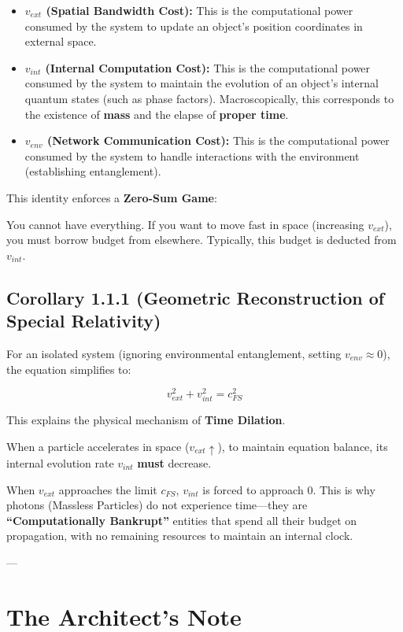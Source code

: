 \documentclass[11pt,a4paper,twoside]{book}
\begin{document}
\begin{itemize}
\item \textbf{$v_{ext}$ (Spatial Bandwidth Cost):} This is the computational power consumed by the system to update an object's position coordinates in external space.

\item \textbf{$v_{int}$ (Internal Computation Cost):} This is the computational power consumed by the system to maintain the evolution of an object's internal quantum states (such as phase factors). Macroscopically, this corresponds to the existence of \textbf{mass} and the elapse of \textbf{proper time}.

\item \textbf{$v_{env}$ (Network Communication Cost):} This is the computational power consumed by the system to handle interactions with the environment (establishing entanglement).
\end{itemize}

This identity enforces a \textbf{Zero-Sum Game}:

You cannot have everything. If you want to move fast in space (increasing \textbf{$v_{ext}$}), you must borrow budget from elsewhere. Typically, this budget is deducted from \textbf{$v_{int}$}.

\subsection{Corollary 1.1.1 (Geometric Reconstruction of Special Relativity)}

For an isolated system (ignoring environmental entanglement, setting \textbf{$v_{env} \approx 0$}), the equation simplifies to:

$$v_{ext}^2 + v_{int}^2 = c_{FS}^2$$

This explains the physical mechanism of \textbf{Time Dilation}.

When a particle accelerates in space (\textbf{$v_{ext} \uparrow$}), to maintain equation balance, its internal evolution rate \textbf{$v_{int}$} \textbf{must} decrease.

When \textbf{$v_{ext}$} approaches the limit \textbf{$c_{FS}$}, \textbf{$v_{int}$} is forced to approach 0. This is why photons (Massless Particles) do not experience time---they are \textbf{``Computationally Bankrupt''} entities that spend all their budget on propagation, with no remaining resources to maintain an internal clock.

---

\section{The Architect's Note}
\end{document}
